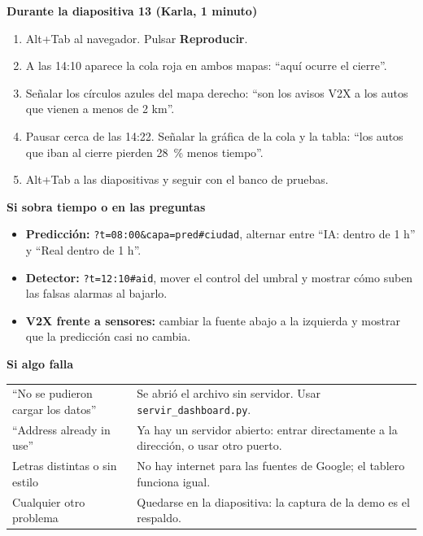 \documentclass[11pt,a4paper]{article}
\newcommand{\sub}[1]{\medskip\par{\large\bfseries #1}\par}
\begin{document}
\sub{Durante la diapositiva 13 (Karla, 1 minuto)}
\begin{enumerate}[leftmargin=*]
\item Alt+Tab al navegador. Pulsar \textbf{Reproducir}.
\item A las 14:10 aparece la cola roja en ambos mapas: ``aquí ocurre el cierre''.
\item Señalar los círculos azules del mapa derecho: ``son los avisos V2X a los autos que vienen a menos de 2 km''.
\item Pausar cerca de las 14:22. Señalar la gráfica de la cola y la tabla: ``los autos que iban al cierre pierden 28~\% menos tiempo''.
\item Alt+Tab a las diapositivas y seguir con el banco de pruebas.
\end{enumerate}

\sub{Si sobra tiempo o en las preguntas}
\begin{itemize}[leftmargin=*]
\item \textbf{Predicción:} \texttt{?t=08:00\&capa=pred\#ciudad}, alternar entre ``IA: dentro de 1 h'' y ``Real dentro de 1 h''.
\item \textbf{Detector:} \texttt{?t=12:10\#aid}, mover el control del umbral y mostrar cómo suben las falsas alarmas al bajarlo.
\item \textbf{V2X frente a sensores:} cambiar la fuente abajo a la izquierda y mostrar que la predicción casi no cambia.
\end{itemize}

\sub{Si algo falla}
\begin{tabular}{@{}p{5.8cm}p{10.4cm}@{}}
``No se pudieron cargar los datos'' & Se abrió el archivo sin servidor. Usar \texttt{servir\_dashboard.py}. \\[2pt]
``Address already in use'' & Ya hay un servidor abierto: entrar directamente a la dirección, o usar otro puerto. \\[2pt]
Letras distintas o sin estilo & No hay internet para las fuentes de Google; el tablero funciona igual. \\[2pt]
Cualquier otro problema & Quedarse en la diapositiva: la captura de la demo es el respaldo. \\
\end{tabular}
\end{document}
